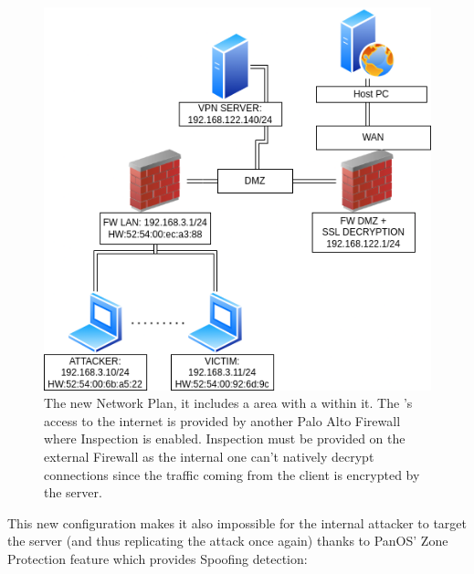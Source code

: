 \begin{figure}[h!]
 \centering
 \includegraphics[width=13.5cm]{img/Network_Plan_DMZ.png}
 \caption{The new Network Plan, it includes a  area with a  within it. The 's access to the internet is provided by another Palo Alto Firewall where  Inspection is enabled.  Inspection must be provided on the external Firewall as the internal one can't natively decrypt  connections since the traffic coming from the client is encrypted by the  server.}
 \label{fig: Network Plan DMZ}
\end{figure}

\newpage

This new configuration makes it also impossible for the internal attacker to target the  server (and thus replicating the attack once again) thanks to PanOS' Zone Protection feature which provides  Spoofing detection:

